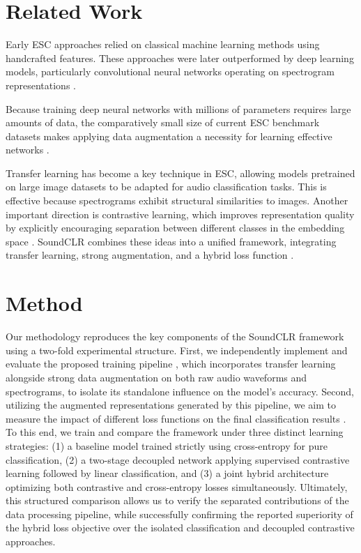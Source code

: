 \documentclass[twocolumn, 10pt]{article}
\begin{document}
\section{Related Work}
Early ESC approaches relied on classical machine learning methods using handcrafted features. These approaches were later outperformed by deep learning models, particularly convolutional neural networks operating on spectrogram representations \cite{zhu2018learning}. 

Because training deep neural networks with millions of parameters requires large amounts of data, the comparatively small size of current ESC benchmark datasets makes applying data augmentation a necessity for learning effective networks \cite{tokozume2018learning, zhang2018deep}. 

Transfer learning has become a key technique in ESC, allowing models pretrained on large image datasets to be adapted for audio classification tasks. This is effective because spectrograms exhibit structural similarities to images. Another important direction is contrastive learning, which improves representation quality by explicitly encouraging separation between different classes in the embedding space \cite{khosla2020supervised}. SoundCLR combines these ideas into a unified framework, integrating transfer learning, strong augmentation, and a hybrid loss function \cite[Sec. III]{soundclr}.

\section{Method}
Our methodology reproduces the key components of the SoundCLR framework using a two-fold experimental structure. First, we independently implement and evaluate the proposed training pipeline \cite[Sec. III-A]{soundclr}, which incorporates transfer learning alongside strong data augmentation on both raw audio waveforms and spectrograms, to isolate its standalone influence on the model's accuracy. Second, utilizing the augmented representations generated by this pipeline, we aim to measure the impact of different loss functions on the final classification results \cite[Sec. III-C]{soundclr}. To this end, we train and compare the framework under three distinct learning strategies: (1) a baseline model trained strictly using cross-entropy for pure classification, (2) a two-stage decoupled network applying supervised contrastive learning followed by linear classification, and (3) a joint hybrid architecture optimizing both contrastive and cross-entropy losses simultaneously. Ultimately, this structured comparison allows us to verify the separated contributions of the data processing pipeline, while successfully confirming the reported superiority of the hybrid loss objective over the isolated classification and decoupled contrastive approaches.
\end{document}
